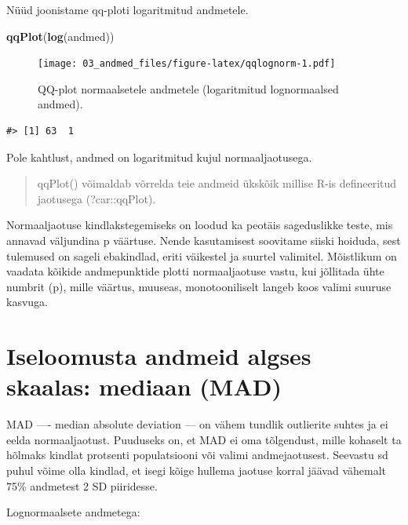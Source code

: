 \documentclass[]{book}
\newenvironment{Shaded}{\begin{snugshade}}{\end{snugshade}}
\newcommand{\KeywordTok}[1]{\textcolor[rgb]{0.13,0.29,0.53}{\textbf{#1}}}
\newcommand{\NormalTok}[1]{#1}
\begin{document}
Nüüd joonistame qq-ploti logaritmitud andmetele.




\begin{Shaded}
\begin{Highlighting}[]
\KeywordTok{qqPlot}\NormalTok{(}\KeywordTok{log}\NormalTok{(andmed))}
\end{Highlighting}
\end{Shaded}

\begin{figure}
\centering
\texttt{[image: 03\_andmed\_files/figure-latex/qqlognorm-1.pdf]}
\caption{\label{fig:qqlognorm}QQ-plot normaalsetele andmetele (logaritmitud
lognormaalsed andmed).}
\end{figure}

\begin{verbatim}
#> [1] 63  1
\end{verbatim}

Pole kahtlust, andmed on logaritmitud kujul normaaljaotusega.

\begin{quote}
qqPlot() võimaldab võrrelda teie andmeid ükskõik millise R-is
defineeritud jaotusega (?car::qqPlot).
\end{quote}

Normaaljaotuse kindlakstegemiseks on loodud ka peotäis sageduslikke
teste, mis annavad väljundina p väärtuse. Nende kasutamisest soovitame
siiski hoiduda, sest tulemused on sageli ebakindlad, eriti väikestel ja
suurtel valimitel. Mõistlikum on vaadata kõikide andmepunktide plotti
normaaljaotuse vastu, kui jõllitada ühte numbrit (p), mille väärtus,
muuseas, monotooniliselt langeb koos valimi suuruse kasvuga.

\section*{Iseloomusta andmeid algses skaalas: mediaan
(MAD)}\label{iseloomusta-andmeid-algses-skaalas-mediaan-mad}

MAD ---- median absolute deviation --- on vähem tundlik outlierite
suhtes ja ei eelda normaaljaotust. Puuduseks on, et MAD ei oma
tõlgendust, mille kohaselt ta hõlmaks kindlat protsenti populatsiooni
või valimi andmejaotusest. Seevastu sd puhul võime olla kindlad, et
isegi kõige hullema jaotuse korral jäävad vähemalt 75\% andmetest 2 SD
piiridesse.

Lognormaalsete andmetega:
\end{document}
